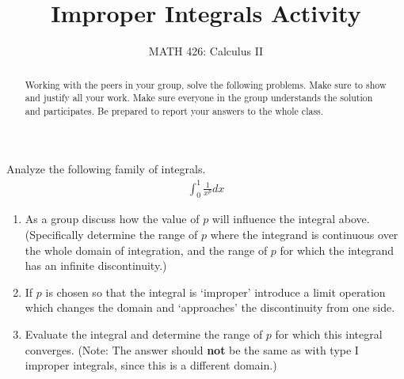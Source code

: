 \documentclass{ximera}
\title{Improper Integrals Activity}
\author{MATH 426: Calculus II}
\begin{document}
\begin{abstract}
   Working with the peers in your group, solve the following problems. Make sure to show and justify all your work. Make sure everyone in the group understands the solution and participates. Be prepared to report your answers to the whole class. 
\end{abstract}
\maketitle

\begin{exercise}
Analyze the following family of integrals.
\begin{align}
	\int_{0}^1 \frac{1}{x^p} dx \nonumber
\end{align}
\begin{enumerate}
\item As a group discuss how the value of $p$ will influence the integral above. (Specifically determine the range of $p$ where the integrand is continuous over the whole domain of integration, and the range of $p$ for which the integrand has an infinite discontinuity.)

\item If $p$ is chosen so that the integral is `improper' introduce a limit operation which changes the domain and `approaches' the discontinuity from one side.
\item Evaluate the integral and determine the range of $p$ for which this integral converges. (Note: The answer should {\bf{not}} be the same as with type I improper integrals, since this is a different domain.)
\end{enumerate}
\end{exercise}
\end{document}
